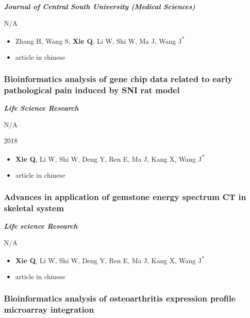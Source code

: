 \documentclass[
]{article}
\providecommand{\tightlist}{%
  \setlength{\itemsep}{0pt}\setlength{\parskip}{0pt}}
\begin{document}
\textbf{\emph{Journal of Central South University (Medical Sciences)}}

N/A

\begin{itemize}
\tightlist
\item
  Zhang H, Wang S, \textbf{Xie Q}, Li W, Shi W, Ma J, Wang
  J\textsuperscript{*}
\item
  article in chinese
\end{itemize}

\hypertarget{bioinformatics-analysis-of-gene-chip-data-related-to-early-pathological-pain-induced-by-sni-rat-model}{%
\subsubsection{Bioinformatics analysis of gene chip data related to
early pathological pain induced by SNI rat
model}\label{bioinformatics-analysis-of-gene-chip-data-related-to-early-pathological-pain-induced-by-sni-rat-model}}

\textbf{\emph{Life Science Research}}

N/A

2018

\begin{itemize}
\tightlist
\item
  \textbf{Xie Q}, Li W, Shi W, Deng Y, Ren E, Ma J, Kang X, Wang
  J\textsuperscript{*}
\item
  article in chinese
\end{itemize}

\hypertarget{advances-in-application-of-gemstone-energy-spectrum-ct-in-skeletal-system}{%
\subsubsection{Advances in application of gemstone energy spectrum CT in
skeletal
system}\label{advances-in-application-of-gemstone-energy-spectrum-ct-in-skeletal-system}}

\textbf{\emph{Life science Research}}

N/A

\begin{itemize}
\tightlist
\item
  \textbf{Xie Q}, Li W, Shi W, Deng Y, Ren E, Ma J, Kang X, Wang
  J\textsuperscript{*}
\item
  article in chinese
\end{itemize}

\hypertarget{bioinformatics-analysis-of-osteoarthritis-expression-profile-microarray-integration}{%
\subsubsection{Bioinformatics analysis of osteoarthritis expression
profile microarray
integration}\label{bioinformatics-analysis-of-osteoarthritis-expression-profile-microarray-integration}}
\end{document}

